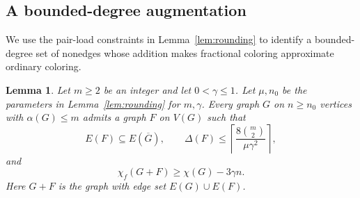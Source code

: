\documentclass[11pt]{article}
\newtheorem{lemma}[theorem]{Lemma}
\begin{document}
\subsection{A bounded-degree augmentation}

We use the pair-load constraints in Lemma~\ref{lem:rounding} to identify a
 bounded-degree set of nonedges whose addition makes fractional coloring approximate
 ordinary coloring.

\begin{lemma}\label{lem:augmentation}
Let $m\ge2$ be an integer and let $0<\gamma\le1$. Let $\mu,n_0$
 be the parameters in Lemma~\ref{lem:rounding} for $m,\gamma$. Every graph $G$ on $n\ge
 n_0$ vertices with $\alpha(G)\le m$ admits a graph $F$ on $V(G)$ such that
\[
 E(F)\subseteq E(\overline G),\qquad
 \Delta(F)\le\left\lceil\frac{8\binom m2}{\mu\gamma^2}\right\rceil,
\]
and
\[
 \chi_f(G+F)\ge\chi(G)-3\gamma n.
\]
Here $G+F$ is the graph with edge set $E(G)\cup E(F)$.
\end{lemma}
\end{document}
